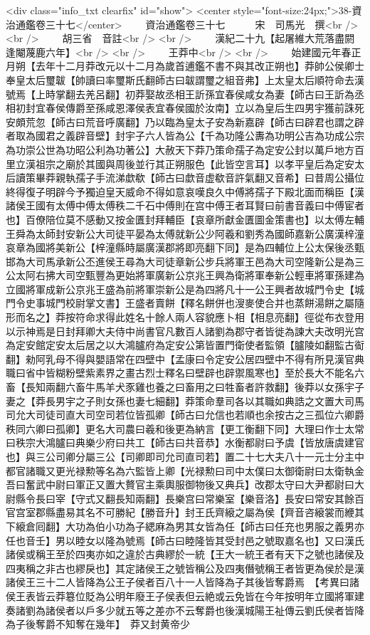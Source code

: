 <div class="info_txt clearfix" id="show">
<center style="font-size:24px;">38-資治通鑑卷三十七</center>
  　　資治通鑑卷三十七　　　宋　司馬光　撰<br />
<br />
　　胡三省　音註<br />
<br />
　　漢紀二十九【起屠維大荒落盡閼逢閹蔑鹿六年】<br />
<br />
　　王莽中<br />
<br />
　　始建國元年春正月朔【去年十二月莽改元以十二月為歲首逋鑑不書不與其改正朔也】莽帥公侯卿士奉皇太后璽韍【帥讀曰率璽斯氏翻師古曰韍謂璽之組音弗】上太皇太后順符命去漢號焉【上時掌翻去羌呂翻】初莽娶故丞相王訢孫宜春侯咸女為妻【師古曰王訢為丞相初封宜春侯傳爵至孫咸恩澤侯表宜春侯國於汝南】立以為皇后生四男宇獲前誅死安頗荒忽【師古曰荒音呼廣翻】乃以臨為皇太子安為新嘉辟【師古曰辟君也謂之辟者取為國君之義辟音壁】封宇子六人皆為公【千為功隆公夀為功明公吉為功成公宗為功崇公世為功昭公利為功著公】大赦天下莽乃策命孺子為定安公封以萬戶地方百里立漢祖宗之廟於其國與周後並行其正朔服色【此皆空言耳】以孝平皇后為定安太后讀策畢莽親執孺子手流涕歔欷【師古曰歔音虚欷音許氣翻又音希】曰昔周公攝位終得復子明辟今予獨迫皇天威命不得如意哀嘆良久中傅將孺子下殿北面而稱臣【漢諸侯王國有太傅中傅太傅秩二千石中傅則在宫中傅王者耳賢曰前書音義曰中傅宦者也】百僚陪位莫不感動又按金匱封拜輔臣【哀章所獻金匱圖金策書也】以太傅左輔王舜為太師封安新公大司徒平晏為太傅就新公少阿羲和劉秀為國師嘉新公廣漢梓潼哀章為國將美新公【梓潼縣時屬廣漢郡將即亮翻下同】是為四輔位上公太保後丞甄邯為大司馬承新公丕進侯王尋為大司徒章新公步兵將軍王邑為大司空隆新公是為三公太阿右拂大司空甄豐為更始將軍廣新公京兆王興為衛將軍奉新公輕車將軍孫建為立國將軍成新公京兆王盛為前將軍崇新公是為四將凡十一公王興者故城門令史【城門令史事城門校尉掌文書】王盛者賣餅【釋名餅併也溲麥使合并也蒸餅湯餅之屬隨形而名之】莽按符命求得此姓名十餘人兩人容貌應卜相【相息亮翻】徑從布衣登用以示神焉是日封拜卿大夫侍中尚書官凡數百人諸劉為郡守者皆徙為諫大夫改明光宫為定安館定安太后居之以大鴻臚府為定安公第皆置門衛使者監領【臚陵如翻監古䘖翻】勑阿乳母不得與嬰語常在四壁中【孟康曰令定安公居四壁中不得有所見漢官典職曰省中皆糊粉壁紫素界之畫古烈士釋名曰壁辟也辟禦風寒也】至於長大不能名六畜【長知兩翻六畜牛馬羊犬豕雞也養之曰畜用之曰牲畜者許救翻】後莽以女孫宇子妻之【莽長男宇之子則女孫也妻七細翻】莽策命羣司各以其職如典誥之文置大司馬司允大司徒司直大司空司若位皆孤卿【師古曰允信也若順也余按古之三孤位六卿爵秩同六卿曰孤卿】更名大司農曰羲和後更為納言【更工衡翻下同】大理曰作士太常曰秩宗大鴻臚曰典樂少府曰共工【師古曰共音恭】水衡都尉曰予虞【皆放唐虞建官也】與三公司卿分屬三公【司卿即司允司直司若】置二十七大夫八十一元士分主中都官諸職又更光禄勲等名為六監皆上卿【光禄勲曰司中太僕曰太御衛尉曰太衛執金吾曰奮武中尉曰軍正又置大贅官主乘輿服御物後又典兵】改郡太守曰大尹都尉曰大尉縣令長曰宰【守式又翻長知兩翻】長樂宫曰常樂室【樂音洛】長安曰常安其餘百官宫室郡縣盡易其名不可勝紀【勝音升】封王氏齊縗之屬為侯【齊音咨縗裳而緶其下縗倉囘翻】大功為伯小功為子緦麻為男其女皆為任【師古曰任充也男服之義男亦任也音壬】男以睦女以隆為號焉【師古曰睦隆皆其受封邑之號取嘉名也】又曰漢氏諸侯或稱王至於四夷亦如之違於古典繆於一統【王大一統王者有天下之號也諸侯及四夷稱之非古也繆戾也】其定諸侯王之號皆稱公及四夷僭號稱王者皆更為侯於是漢諸侯王三十二人皆降為公王子侯者百八十一人皆降為子其後皆奪爵焉　【考異曰諸侯王表皆云莽簒位貶為公明年廢王子侯表但云絶或云免皆在今年按明年立國將軍建奏諸劉為諸侯者以戶多少就五等之差亦不云奪爵也後漢城陽王祉傳云劉氏侯者皆降為子後奪爵不知奪在幾年】　莽又封黄帝少